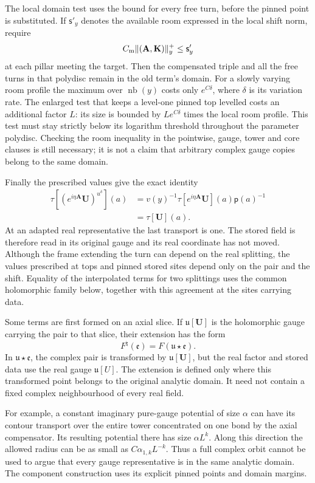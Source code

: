 \documentclass[11pt,letterpaper,reqno]{amsart}
\theoremstyle{definition}
\theoremstyle{remark}
\begin{document}
The local domain test uses the bound for every free turn, before
the pinned point is substituted. If \(\mathsf s'_y\) denotes
the available room expressed in the local shift norm, require
\[
 C_{\rm m}\|(\mathbf A,\mathbf K)\|_y^+\le\mathsf s'_y
\]
at each pillar meeting the target. Then the compensated triple
and all the free turns in that polydisc remain in the old term's
domain. For a slowly varying room profile the maximum over
\(\operatorname{nb}(y)\) costs only \(e^{C\delta}\), where
\(\delta\) is its variation rate. The enlarged test that keeps
a level-one pinned top levelled costs an additional factor \(L\):
its size is bounded by \(Le^{C\delta}\) times the local room
profile. This test must stay strictly below its logarithm
threshold throughout the parameter polydisc. Checking the room inequality in
the pointwise, gauge, tower and core clauses is still necessary;
it is not a claim that arbitrary complex gauge copies belong
to the same domain.

Finally the prescribed values give the exact identity
\[
 \begin{split}
 \tau[(e^{i\eta\mathbf A}\mathbf U)^{u^\delta}](a)
 &=v(y)^{-1}\tau[e^{i\eta\mathbf A}\mathbf U](a)
                                              \mathsf p(a)^{-1}\\
 &=\tau[\mathbf U](a).
 \end{split}
\]
At an adapted real representative the last transport is one.
The stored field is therefore read in its original gauge and its
real coordinate has not moved. Although the frame extending the
turn can depend on the real splitting, the values prescribed at
tops and pinned stored sites depend only on the pair and the
shift. Equality of the interpolated terms for two splittings
uses the common holomorphic family below, together with this
agreement at the sites carrying data.


Some terms are first formed on an
axial slice. If $\mathfrak u[\mathbf U]$
is the holomorphic gauge carrying
the pair to that slice, their extension
has the form
\[
 F^\natural(\mathfrak e)
                   =F(\mathfrak u\star\mathfrak e).
\]
In $\mathfrak u\star\mathfrak e$,
the complex pair is transformed by
$\mathfrak u[\mathbf U]$, but the
real factor and stored data use the
real gauge $\mathfrak u[U]$.
The extension is defined only where
this transformed point belongs to
the original analytic domain.
It need not contain a fixed complex
neighbourhood of every real field.

For example, a constant imaginary
pure-gauge potential of size $\alpha$
can have its contour transport over
the entire tower concentrated on
one bond by the axial compensator.
Its resulting potential there has
size $\alpha L^k$. Along this
direction the allowed radius can
be as small as
$C\alpha_{1,k}L^{-k}$.
Thus a full complex orbit cannot
be used to argue that every gauge
representative is in the same
analytic domain. The component
construction uses its explicit
pinned points and domain margins.
\end{document}
